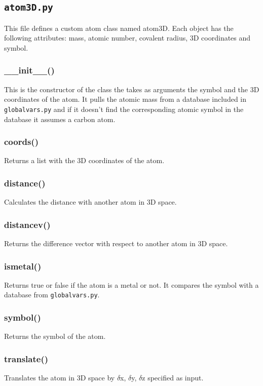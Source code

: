 \documentclass[a4paper,12pt]{assignment}
\begin{document}
\subsection{\texttt{atom3D.py}}
This file defines a custom atom class named atom3D. Each object has the following attributes: mass, atomic number, covalent radius, 3D coordinates and symbol.  
\subsubsection{\_\_init\_\_()}
This is the constructor of the class the takes as arguments the symbol and the 3D coordinates of the atom. It pulls the atomic mass from a database included in \texttt{globalvars.py} and if it doesn't find the corresponding atomic symbol in the database it assumes a carbon atom. 

\subsubsection{coords()}
Returns a list with the 3D coordinates of the atom.

\subsubsection{distance()}
Calculates the distance with another atom in 3D space.

\subsubsection{distancev()}
Returns the difference vector with respect to another atom in 3D space.

\subsubsection{ismetal()}
Returns true or false if the atom is a metal or not. It compares the symbol with a database from \texttt{globalvars.py}.

\subsubsection{symbol()}
Returns the symbol of the atom.

\subsubsection{translate()}
Translates the atom in 3D space by $\delta$x, $\delta$y, $\delta$z specified as input.
\end{document}
